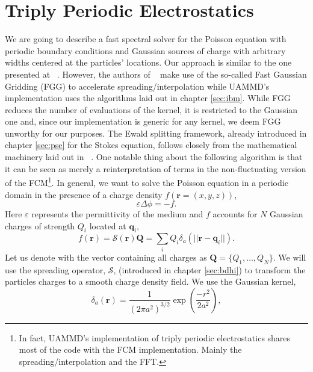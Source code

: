 \documentclass[ twoside,openright,titlepage,numbers=noenddot,%
headinclude,footinclude,cleardoublepage=empty,abstract=on,
BCOR=5mm,paper=b5,fontsize=11pt, dvipsnames
]{scrreprt}
\renewcommand{\vec}[1]{\bm{#1}}
\newcommand{\oper}[1]{\mathcal{#1}}
\newcommand{\ppos}{q}
\newcommand{\fpos}{r}
\begin{document}
\chapter{Triply Periodic Electrostatics} \label{ch:tppoisson}

We are going to describe a fast spectral solver for the Poisson equation with periodic boundary conditions and Gaussian sources of charge with arbitrary widths centered at the particles' locations. Our approach is similar to the one presented at ~\cite{Lindbo2011}. However, the authors of ~\cite{Lindbo2011} make use of the so-called Fast Gaussian Gridding (FGG) to accelerate spreading/interpolation while UAMMD's implementation uses the algorithms laid out in chapter \ref{sec:ibm}. While FGG reduces the number of evaluations of the kernel, it is restricted to the Gaussian one and, since our implementation is generic for any kernel, we deem FGG unworthy for our purposes. The Ewald splitting framework, already introduced in chapter \ref{sec:pse} for the Stokes equation, follows closely from the mathematical machinery laid out in ~\cite{Tornberg2015}.
One notable thing about the following algorithm is that it can be seen as merely a reinterpretation of terms in the non-fluctuating version of the \gls{FCM}\footnote{In fact, UAMMD's implementation of triply periodic electrostatics shares most of the code with the \gls{FCM} implementation. Mainly the spreading/interpolation and the \gls{FFT}.}.
In general, we want to solve the Poisson equation in a periodic domain in the presence of a charge density $f(\vec{\fpos}=(x,y,z))$,
\begin{equation}
  \label{eq:ttpoisson}
 \varepsilon\Delta\phi=-f.
\end{equation}
Here $\varepsilon$ represents the permittivity of the medium and $f$ accounts for $N$ Gaussian charges of strength $Q_i$ located at $\vec{\ppos}_i$,
\begin{equation}
  \label{eq:tppoisson_cdens}
  f(\vec{\fpos})= \oper{S}(\vec{\fpos})\vec{Q} = \sum_iQ_i\delta_a(||\vec{\fpos}-\vec{\ppos}_i||).
\end{equation}
Let us denote with the vector containing all charges as $\vec{Q} = \{Q_1,\dots,Q_N\}$.
We will use the spreading operator, $\oper{S}$, (introduced in chapter \ref{sec:bdhi}) to transform the particles charges to a smooth charge density field. We use the Gaussian kernel,
\begin{equation}
  \label{eq:tpppoisson_gaussiansource}
  \delta_a(\vec{r})=\frac{1}{\left(2\pi a^2\right)^{3/2}}\exp{\left(\frac{-r^2}{2a^2}\right)},
\end{equation}
\end{document}
